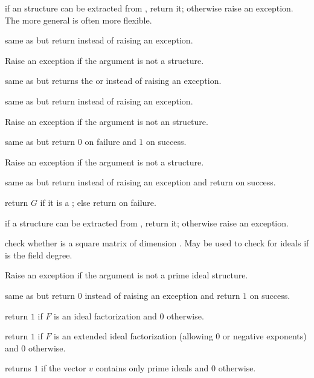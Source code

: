  if an  structure can be extracted from
, return it; otherwise raise an exception. The more general
 is often more flexible.

 same as  but return 
instead of raising an exception.

 Raise an exception if the argument
is not a  structure.

 same as  but returns the
 or  instead of raising an exception.

 same as  but return 
instead of raising an exception.

 Raise an exception if the argument is not an
 structure.

 same as  but return $0$
on failure and $1$ on success.

 Raise an exception if the argument is not a
 structure.

 same as  but return 
instead of raising an exception and return  on success.

 return $G$ if it is a ;
else return  on failure.

 if a  structure can be extracted
from , return it; otherwise raise an exception.

 check whether  is a square matrix
of dimension . May be used to check for ideals if  is the field
degree.

 Raise an exception if the argument is not a
prime ideal structure.

 same as  but return $0$
instead of raising an exception and return $1$ on success.

 return $1$ if $F$ is an ideal factorization
and $0$ otherwise.

 return $1$ if $F$ is an extended ideal
factorization (allowing $0$ or negative exponents) and $0$ otherwise.

 returns $1$ if the vector $v$ contains only
prime ideals and $0$ otherwise.


